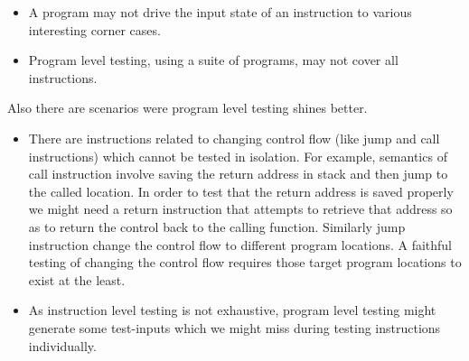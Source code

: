 \begin{itemize}
    \item A program may not drive the input state of an instruction to various interesting corner cases.
    \item Program level testing, using a suite of programs, may not cover all instructions.
\end{itemize} 
Also there are scenarios were  program level testing shines better. 
\begin{itemize}
    \item There are instructions related to changing control flow (like jump and call instructions) which cannot be tested in isolation. For example, semantics of call instruction involve saving the return address in stack and then jump to the called location. In order to test that the return address is saved properly we might need a return instruction that attempts to retrieve that address so as to return the control back to the calling function. Similarly jump instruction change the control flow to different program locations. A faithful testing of changing the control flow requires those target program locations to exist at the least.     
    
    \item As instruction level testing is not exhaustive, program level testing might generate some test-inputs which we might miss during testing instructions individually.  
\end{itemize}   



